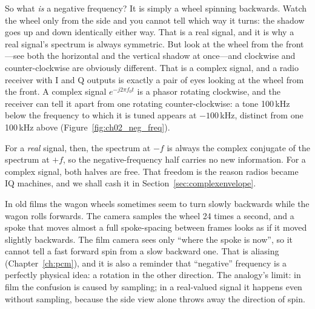 So what \emph{is} a negative frequency? It is simply a wheel spinning backwards. Watch the wheel only
from the side and you cannot tell which way it turns: the shadow goes up and down identically either
way. That is a real signal, and it is why a real signal's spectrum is always symmetric. But look at
the wheel from the front---see both the horizontal and the vertical shadow at once---and clockwise
and counter-clockwise are obviously different. That is a complex signal, and a radio receiver with
I and Q outputs is exactly a pair of eyes looking at the wheel from the front. A complex signal
$e^{-j2\pi f_0 t}$ is a phasor rotating clockwise, and the receiver can tell it apart from one
rotating counter-clockwise: a tone 100\,kHz below the frequency to which it is tuned appears at
$-100$\,kHz, distinct from one 100\,kHz above (Figure~\ref{fig:ch02_neg_freq}).


For a \emph{real} signal, then, the spectrum at $-f$ is always the complex conjugate of the spectrum at
$+f$, so the negative-frequency half carries no new information. For a complex signal, both halves
are free. That freedom is the reason radios became IQ machines, and we shall cash it in
Section~\ref{sec:complexenvelope}.

\begin{analogy}
In old films the wagon wheels sometimes seem to turn slowly backwards while the wagon rolls forwards.
The camera samples the wheel 24 times a second, and a spoke that moves almost a full spoke-spacing
between frames looks as if it moved slightly backwards. The film camera sees only ``where the spoke
is now'', so it cannot tell a fast forward spin from a slow backward one. That is aliasing
(Chapter~\ref{ch:pcm}), and it is also a reminder that ``negative'' frequency is a perfectly physical
idea: a rotation in the other direction. The analogy's limit: in film the confusion is caused by
sampling; in a real-valued signal it happens even without sampling, because the side view alone
throws away the direction of spin.
\end{analogy}

